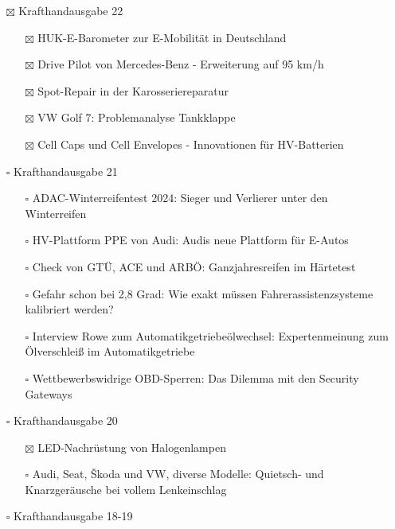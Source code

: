 \documentclass{vorlage-design-main}
\begin{document}
\begin{itemize}

\item[$\boxtimes$]
  Krafthandausgabe 22

  \begin{itemize}

  \item[$\boxtimes$]
    HUK-E-Barometer zur E-Mobilität in Deutschland
  \item[$\boxtimes$]
    Drive Pilot von Mercedes-Benz - Erweiterung auf 95 km/h
  \item[$\boxtimes$]
    Spot-Repair in der Karosseriereparatur
  \item[$\boxtimes$]
    VW Golf 7: Problemanalyse Tankklappe
  \item[$\boxtimes$]
    Cell Caps und Cell Envelopes - Innovationen für HV-Batterien
  \end{itemize}
\item[$\square$]
  Krafthandausgabe 21

  \begin{itemize}

  \item[$\square$]
    ADAC-Winterreifentest 2024: Sieger und Verlierer unter den
    Winterreifen
  \item[$\square$]
    HV-Plattform PPE von Audi: Audis neue Plattform für E-Autos
  \item[$\square$]
    Check von GTÜ, ACE und ARBÖ: Ganzjahresreifen im Härtetest
  \item[$\square$]
    Gefahr schon bei 2,8 Grad: Wie exakt müssen Fahrerassistenzsysteme
    kalibriert werden?
  \item[$\square$]
    Interview Rowe zum Automatikgetriebeölwechsel: Expertenmeinung zum
    Ölverschleiß im Automatikgetriebe
  \item[$\square$]
    Wettbewerbswidrige OBD-Sperren: Das Dilemma mit den Security
    Gateways
  \end{itemize}
\item[$\square$]
  Krafthandausgabe 20

  \begin{itemize}

  \item[$\boxtimes$]
    LED-Nachrüstung von Halogenlampen
  \item[$\square$]
    Audi, Seat, Škoda und VW, diverse Modelle: Quietsch- und
    Knarzgeräusche bei vollem Lenkeinschlag
  \end{itemize}
\item[$\square$]
  Krafthandausgabe 18-19


\end{itemize}
\end{document}
